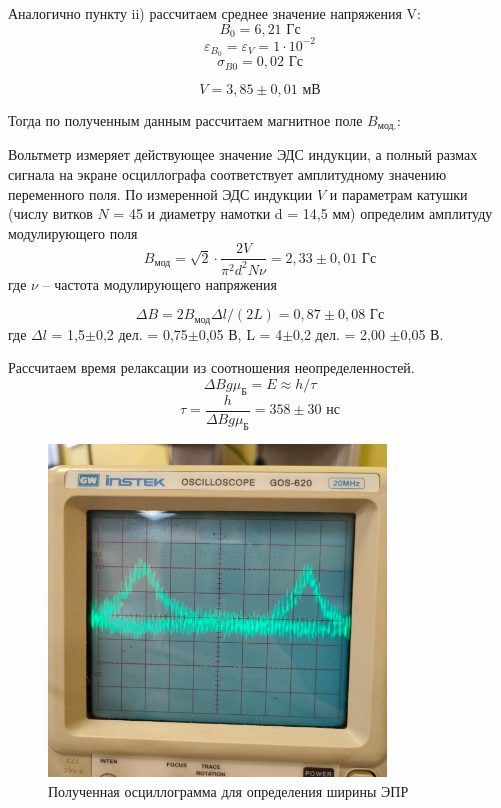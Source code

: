 \documentclass[a4paper, 12pt]{article}%
\begin{document}
\begin{enumerate}
		Аналогично пункту ii) рассчитаем среднее значение напряжения V:
			$$ B_{\text{0}}= 6,21 \text{ Гс} $$
		$$ \varepsilon_{B_{0}} = \varepsilon_V  = 1 \cdot 10^{-2} $$
		$$ \sigma_{B{0}} = 0,02 \text{ Гс}$$
		
		$$ V = 3,85 \pm 0,01 \text{ мВ} $$
		
		Тогда по полученным данным рассчитаем магнитное поле $B_{\text{мод.}}$:
	
		
		  Вольтметр измеряет действующее значение ЭДС индукции, а полный размах сигнала на экране осциллографа соответствует амплитудному значению переменного поля. По измеренной ЭДС индукции $V$ и параметрам катушки (числу витков $N$ = 45 и диаметру
		намотки d = 14,5 мм) определим амплитуду модулирующего поля 
		$$ B_{\text{мод}} = \sqrt{2} \cdot \frac{2V}{\pi^2 d^2 N \nu} = 2,33 \pm 0,01 \text{ Гс}$$ 
		где $\nu$ --
		частота модулирующего напряжения
		
		$$ \Delta B = 2 B_{\text{мод}}  \Delta l / (2L) = 0,87 \pm 0,08\text{ Гс}$$
		где $\Delta l $ = 1,5$\pm$0,2 дел. = 0,75$\pm$0,05 В, L = 4$\pm$0,2 дел. = 2,00 $\pm$0,05 В.
		
		Рассчитаем время релаксации из соотношения неопределенностей.
		$$ \Delta B g \mu_{\text{Б}} = E \approx h/\tau $$
		$$ \tau =  \frac{h}{\Delta B g \mu_{\text{Б}}} = 358 \pm 30\text{ нс} $$
		
			\begin{figure}[H]
			\begin{center}
				\includegraphics[width = 0.8\textwidth]{pict}
				\caption{Полученная осциллограмма для определения ширины ЭПР}
			\end{center}
		\end{figure}
		

\end{enumerate}
\end{document}
